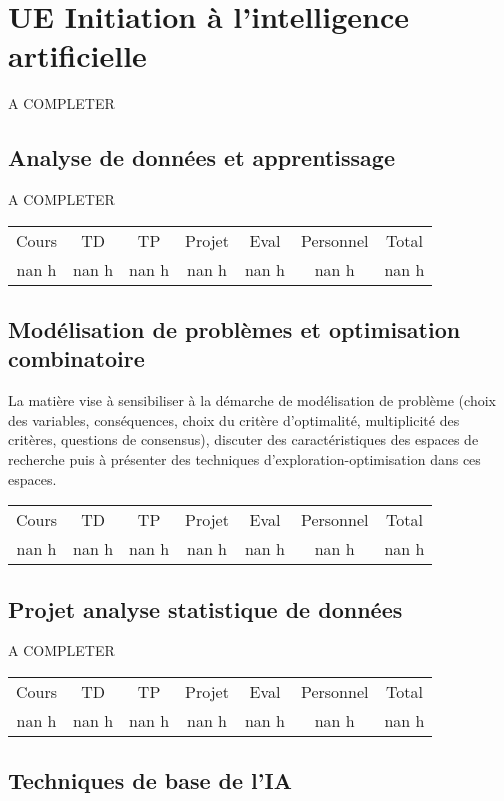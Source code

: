 \section{UE Initiation à l'intelligence artificielle}%
\label{sec:UEInitiationlintelligenceartificielle}%
A COMPLETER%
\subsection{Analyse de données et apprentissage}%
\label{subsec:Analysededonnesetapprentissage}%

%
A COMPLETER%
\begin{longtable}{c c c c c c c}%
\hline%
Cours&TD&TP&Projet&Eval&Personnel&Total\\%
nan h&nan h&nan h&nan h&nan h&nan h&nan h\\%
\hline%
\end{longtable}%
\subsection{Modélisation de problèmes et optimisation combinatoire}%
\label{subsec:Modlisationdeproblmesetoptimisationcombinatoire}%

%
La matière vise à sensibiliser à la démarche de modélisation de problème (choix des variables, conséquences, choix du critère d'optimalité, multiplicité des critères, questions de consensus), discuter des caractéristiques des espaces de recherche puis à présenter des techniques d'exploration{-}optimisation dans ces espaces.%
\begin{longtable}{c c c c c c c}%
\hline%
Cours&TD&TP&Projet&Eval&Personnel&Total\\%
nan h&nan h&nan h&nan h&nan h&nan h&nan h\\%
\hline%
\end{longtable}%
\subsection{Projet analyse statistique de données}%
\label{subsec:Projetanalysestatistiquededonnes}%

%
A COMPLETER%
\begin{longtable}{c c c c c c c}%
\hline%
Cours&TD&TP&Projet&Eval&Personnel&Total\\%
nan h&nan h&nan h&nan h&nan h&nan h&nan h\\%
\hline%
\end{longtable}%
\subsection{Techniques de base de l'IA}%
\label{subsec:TechniquesdebasedelIA}%

